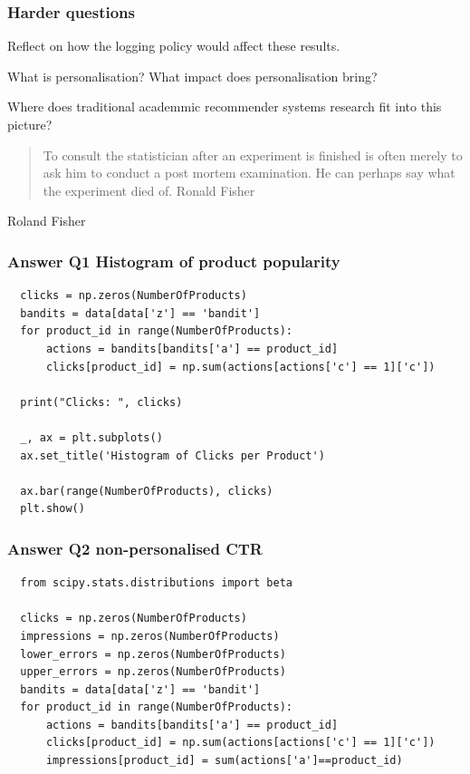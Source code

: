 \begin{frame}
  \frametitle{Harder questions}

Reflect on how the logging policy would affect these results.

\pause

What is personalisation? What impact does personalisation bring?

\pause

Where does traditional academmic recommender systems research fit into this picture?  

\end{frame}


\begin{frame}
\begin{quote}
  To consult the statistician after an experiment is finished is often merely to ask him to conduct a post mortem examination. He can perhaps say what the experiment died of. Ronald Fisher
\end{quote}
Roland Fisher
\end{frame}

\begin{frame}[fragile]
  \frametitle{Answer Q1 Histogram of product popularity}
\begin{small}
\begin{verbatim}
  clicks = np.zeros(NumberOfProducts)
  bandits = data[data['z'] == 'bandit']
  for product_id in range(NumberOfProducts):
      actions = bandits[bandits['a'] == product_id]
      clicks[product_id] = np.sum(actions[actions['c'] == 1]['c'])
      
  print("Clicks: ", clicks)
  
  _, ax = plt.subplots()
  ax.set_title('Histogram of Clicks per Product')
  
  ax.bar(range(NumberOfProducts), clicks)
  plt.show()
\end{verbatim}
\end{small}
\end{frame}


\begin{frame}[fragile]
  \frametitle{Answer Q2 non-personalised CTR}
\begin{tiny}
\begin{verbatim}
  from scipy.stats.distributions import beta

  clicks = np.zeros(NumberOfProducts)
  impressions = np.zeros(NumberOfProducts)
  lower_errors = np.zeros(NumberOfProducts)
  upper_errors = np.zeros(NumberOfProducts)
  bandits = data[data['z'] == 'bandit']
  for product_id in range(NumberOfProducts):
      actions = bandits[bandits['a'] == product_id]
      clicks[product_id] = np.sum(actions[actions['c'] == 1]['c'])
      impressions[product_id] = sum(actions['a']==product_id)
\end{verbatim}
\end{tiny}
\end{frame}

